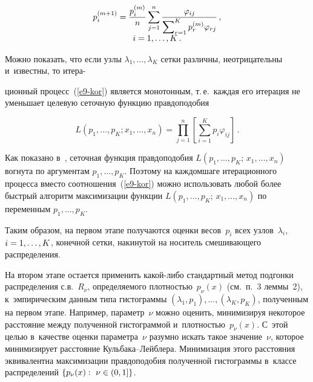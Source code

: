\begin{multicols}{2}
\vspace*{-6pt}

\noindent
\begin{multline}
p_i^{(m+1)}=\displaystyle\frac{\displaystyle p_i^{(m)}\mathstrut}{\displaystyle n\mathstrut}\sum\limits_{j=1}^n
\displaystyle\frac{\displaystyle \varphi_{ij}\mathstrut}{\displaystyle \sum\nolimits_{r=1}^Kp_r^{(m)}\varphi_{rj}\mathstrut}\,,
\\[-5pt]
 i=1,\ldots,K\,.
\label{e9-kor}
\end{multline}

\vspace*{-5pt}

\noindent
Можно показать, что если узлы $\lambda_1,\ldots,\lambda_K$ сетки
различны, неотрицательны и~известны, то итера-\linebreak\vspace*{-12pt}

\columnbreak

\noindent
ционный процесс~(\ref{e9-kor})
является монотонным, т.\,е.\
 каж\-дая его итерация не уменьшает
целевую сеточную функцию правдоподобия

\vspace*{-2pt}

\noindent
$$
L(p_1,\ldots,p_K;x_1,\ldots,x_n)=\prod\limits_{j=1}^n\left[\sum\limits_{i=1}^K
p_i\varphi_{ij}\right]\,.
$$

\vspace*{-2pt}

\noindent
Как показано в~\cite[разд.~5.7.4]{Korolev2011}, сеточная
функция правдоподобия $L(p_1,\ldots,p_{K};\,x_1,\ldots,x_n)$ вогнута по
аргументам $p_1,\ldots,p_{K}$. Поэтому на каж\-дом\linebreak шаге итерационного
процесса вместо соотношения~(\ref{e9-kor}) можно использовать любой более
быстрый алгоритм максимизации функции
$L(p_1,\ldots,p_{K};\,x_1,\ldots,x_n)$ по переменным $p_1,\ldots,p_{K}$.

Таким образом, на первом этапе получаются оценки весов~$p_i$ всех
узлов~$\lambda_i$, $i\hm=1,\ldots,K$, конечной сетки, накинутой на
носитель смешивающего распределения.

На втором этапе остается применить ка\-кой-ли\-бо стандартный метод
подгонки распределения с.в.~$R_{\nu}$, определяемого
плот\-ностью~$p_{\nu}(x)$ (см.\ п.~3 леммы~2), к~эмпирическим данным
типа гистограммы $(\lambda_1, p_1),\ldots, (\lambda_K, p_K)$,
полученным на первом этапе. Например, параметр~$\nu$ можно оценить,
минимизируя некоторое расстояние между полученной гистограммой 
и~плот\-ностью~$p_{\nu}(x)$. С~этой целью в~качестве оценки параметра~$\nu$ 
разумно искать такое значение~$\nu$, которое минимизирует
расстояние Куль\-ба\-ка--Лейб\-ле\-ра. Минимизация этого расстояния
эквивалентна максимизации правдоподобия полученной гистограммы 
в~классе распределений $\{p_{\nu}(x):\ \nu\hm\in(0,1]\}$.


\end{multicols}
